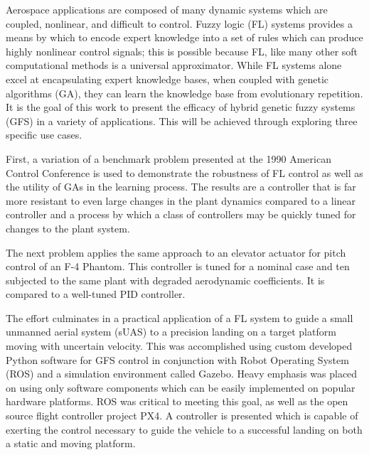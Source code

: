Aerospace applications are composed of many dynamic systems which are coupled, nonlinear, and difficult to
control. Fuzzy logic (FL) systems  provides a means by which to encode expert knowledge into a set of rules
which can produce highly nonlinear control signals; this is possible because FL, like many other soft
computational methods is a universal approximator. While FL systems alone excel at encapsulating expert
knowledge bases, when coupled with genetic algorithms (GA), they can learn the knowledge base from
evolutionary repetition. It is the goal of this work to present the efficacy of hybrid genetic fuzzy systems
(GFS) in a variety of applications. This will be achieved through exploring three specific use cases.

First, a variation of a benchmark problem presented at the 1990 American Control Conference is used to
demonstrate the robustness of FL control as well as the utility of GAs in the learning process. The results
are a controller that is far more resistant to even large changes in the plant dynamics compared to a linear
controller and a process by which a class of controllers may be quickly tuned for changes to the plant system.

The next problem applies the same approach to an elevator actuator for pitch control of an F-4 Phantom. This
controller is tuned for a nominal case and ten subjected to the same plant with degraded aerodynamic
coefficients. It is compared to a well-tuned PID controller.

The effort culminates in a practical application of a FL system to guide a small unmanned aerial system (sUAS)
to a precision landing on a target platform moving with uncertain velocity. This was accomplished using
custom developed Python software for GFS control in conjunction with Robot Operating System (ROS) and a
simulation environment called Gazebo. Heavy emphasis was placed on using only software components which can be
easily implemented on popular hardware platforms. ROS was critical to meeting this goal, as well as the open
source flight controller project PX4. A controller is presented which is capable of exerting the control
necessary to guide the vehicle to a successful landing on both a static and moving platform.
